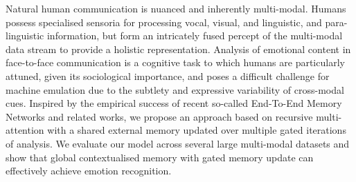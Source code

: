 Natural human communication is nuanced and inherently multi-modal. Humans possess specialised sensoria for processing vocal, visual, and linguistic, and para-linguistic information, but form an intricately fused percept of the multi-modal data stream to provide a holistic representation. Analysis of emotional content in face-to-face communication is a cognitive task to which humans are particularly attuned, given its sociological importance, and poses a difficult challenge for machine emulation due to the subtlety and expressive variability of cross-modal cues. Inspired by the empirical success of recent so-called End-To-End Memory Networks and related works, we propose an approach based on recursive multi-attention with a shared external memory updated over multiple gated iterations of analysis. We evaluate our model across several large multi-modal datasets and show that global contextualised memory with gated memory update can effectively achieve emotion recognition.
